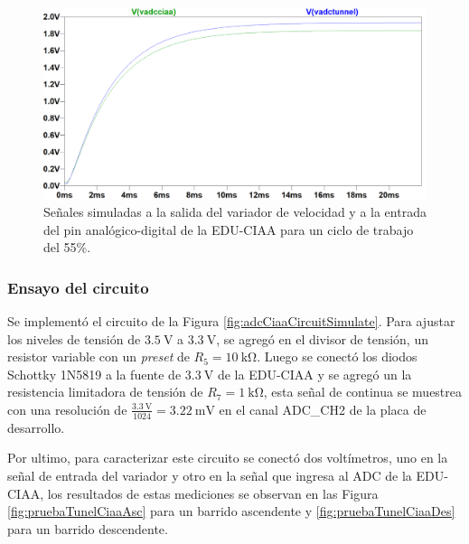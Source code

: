 \begin{figure}[H]
    \centering
    \includegraphics[width=1\linewidth]{Figuras/datalogger/Hardware/adc55PercentPwm.png}
    \caption{Señales simuladas a la salida del variador de velocidad y a la entrada del pin analógico-digital de la EDU-CIAA para un ciclo de trabajo del 55\%.}
    \label{fig:adc55PercentPwm}
\end{figure}

\subsubsection{Ensayo del circuito}

Se implementó el circuito de la Figura \ref{fig:adcCiaaCircuitSimulate}. Para ajustar los niveles de tensión de $\SI{3.5}{\volt}$ a $\SI{3.3}{\volt}$, se agregó en el divisor de tensión, un resistor variable con un \textit{preset} de $R_{5} = \SI{10}{\kilo\ohm}$. Luego se conectó los diodos Schottky 1N5819 \cite{1N5819_datasheet} a la fuente de $\SI{3.3}{\volt}$ de la EDU-CIAA y se agregó un la resistencia limitadora de tensión de $R_{7} = \SI{1}{\kilo\ohm}$, esta señal de continua se muestrea con una resolución  de $\frac{\SI{3.3}{\volt}}{1024} = \SI{3.22}{\milli\volt}$  en el canal ADC\_CH2 de la placa de desarrollo.


Por ultimo, para caracterizar este circuito se conectó dos voltímetros, uno en la señal de entrada del variador y otro en la señal que ingresa al ADC de la EDU-CIAA, los resultados de estas mediciones se observan en las Figura \ref{fig:pruebaTunelCiaaAsc} para un barrido ascendente y \ref{fig:pruebaTunelCiaaDes} para un barrido descendente.

